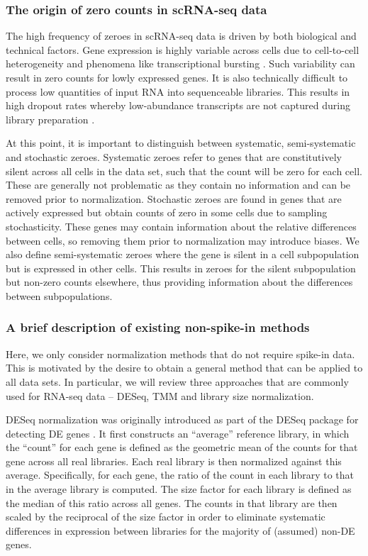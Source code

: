 \documentclass{bmcart}
\begin{document}
\subsubsection*{The origin of zero counts in scRNA-seq data}
The high frequency of zeroes in scRNA-seq data is driven by both biological and technical factors.
Gene expression is highly variable across cells due to cell-to-cell heterogeneity and phenomena like transcriptional bursting \cite{marinov2014singlecell}.
Such variability can result in zero counts for lowly expressed genes.
It is also technically difficult to process low quantities of input RNA into sequenceable libraries.
This results in high dropout rates whereby low-abundance transcripts are not captured during library preparation \cite{brennecke2013accounting}.

At this point, it is important to distinguish between systematic, semi-systematic and stochastic zeroes.
Systematic zeroes refer to genes that are constitutively silent across all cells in the data set, such that the count will be zero for each cell.
These are generally not problematic as they contain no information and can be removed prior to normalization.
Stochastic zeroes are found in genes that are actively expressed but obtain counts of zero in some cells due to sampling stochasticity.
These genes may contain information about the relative differences between cells, so removing them prior to normalization may introduce biases.
We also define semi-systematic zeroes where the gene is silent in a cell subpopulation but is expressed in other cells.
This results in zeroes for the silent subpopulation but non-zero counts elsewhere, thus providing information about the differences between subpopulations.

\subsubsection*{A brief description of existing non-spike-in methods}
Here, we only consider normalization methods that do not require spike-in data.
This is motivated by the desire to obtain a general method that can be applied to all data sets.
In particular, we will review three approaches that are commonly used for RNA-seq data -- DESeq, TMM and library size normalization.

DESeq normalization was originally introduced as part of the DESeq package for detecting DE genes \cite{anders2010differential}.
It first constructs an ``average'' reference library, in which the ``count'' for each gene is defined as the geometric mean of the counts for that gene across all real libraries.
Each real library is then normalized against this average.
Specifically, for each gene, the ratio of the count in each library to that in the average library is computed.
The size factor for each library is defined as the median of this ratio across all genes.
The counts in that library are then scaled by the reciprocal of the size factor in order to eliminate systematic differences in expression between libraries for the majority of (assumed) non-DE genes.
\end{document}
